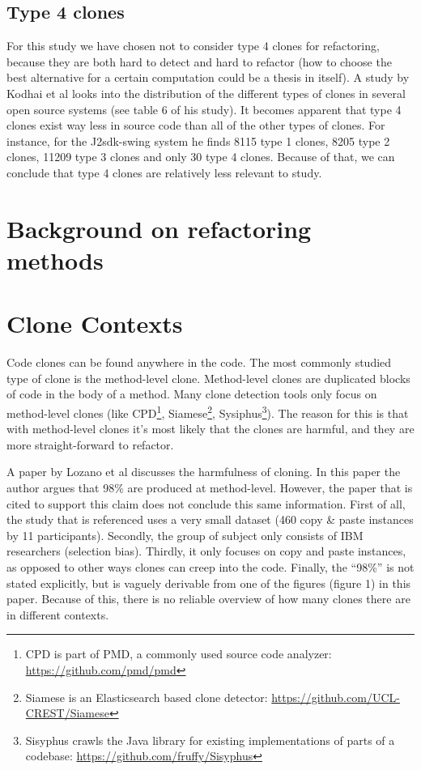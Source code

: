 \subsection{Type 4 clones}
For this study we have chosen not to consider type 4 clones for refactoring, because they are both hard to detect and hard to refactor (how to choose the best alternative for a certain computation could be a thesis in itself). A study by Kodhai et al \cite{kodhai2013method} looks into the distribution of the different types of clones in several open source systems (see table 6 of his study). It becomes apparent that type 4 clones exist way less in source code than all of the other types of clones. For instance, for the J2sdk-swing system he finds 8115 type 1 clones, 8205 type 2 clones, 11209 type 3 clones and only 30 type 4 clones. Because of that, we can conclude that type 4 clones are relatively less relevant to study.

\section{Background on refactoring methods}

\section{Clone Contexts} %
Code clones can be found anywhere in the code. The most commonly studied type of clone is the method-level clone. Method-level clones are duplicated blocks of code in the body of a method. Many clone detection tools only focus on method-level clones (like CPD\footnote{CPD is part of PMD, a commonly used source code analyzer: \url{https://github.com/pmd/pmd}}, Siamese\footnote{Siamese is an Elasticsearch based clone detector: \url{https://github.com/UCL-CREST/Siamese}}, Sysiphus\footnote{Sisyphus crawls the Java library for existing implementations of parts of a codebase: \url{https://github.com/fruffy/Sisyphus}}). The reason for this is that with method-level clones it's most likely that the clones are harmful, and they are more straight-forward to refactor.

A paper by Lozano et al \cite{lozano2007evaluating} discusses the harmfulness of cloning. In this paper the author argues that 98\% are produced at method-level. However, the paper that is cited to support this claim \cite{bergman2004ethnographic} does not conclude this same information. First of all, the study that is referenced uses a very small dataset (460 copy \& paste instances by 11 participants). Secondly, the group of subject only consists of IBM researchers (selection bias). Thirdly, it only focuses on copy and paste instances, as opposed to other ways clones can creep into the code. Finally, the ``98\%'' is not stated explicitly, but is vaguely derivable from one of the figures (figure 1) in this paper. Because of this, there is no reliable overview of how many clones there are in different contexts.

